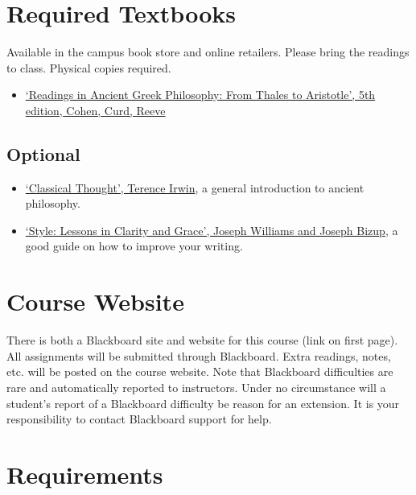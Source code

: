 \documentclass[article,oneside]{memoir}
\begin{document}
\section{Required Textbooks}

Available in the campus book store and online retailers. Please bring the readings to class. Physical copies required.
\begin{itemize}
\item \href{https://www.amazon.com/Readings-Ancient-Greek-Philosophy-Aristotle/dp/1624665322/ref=dp_ob_title_bk}{`Readings in Ancient Greek Philosophy: From Thales to Aristotle', 5th edition, Cohen, Curd, Reeve}


\end{itemize}
\subsection{Optional}

\begin{itemize}
\item \href{https://www.amazon.com/Classical-Thought-History-Western-Philosophy/dp/0192891774/ref=sr_1_1?s=books&ie=UTF8&qid=1515009994&sr=1-1&keywords=classical+thought}{`Classical Thought', Terence Irwin}, a general introduction to ancient philosophy.

\item \href{http://www.amazon.com/Style-Lessons-Clarity-Grace-11th/dp/0321898680/ref=sr_1_1?ie=UTF8&qid=1452356026&sr=8-1&keywords=lessons+in+clarity+and+grace}{`Style: Lessons in Clarity and Grace', Joseph Williams and Joseph Bizup}, a good guide on how to improve your writing. 
\end{itemize}
\section{Course Website}
There is both a Blackboard site and website for this course (link on first page). All assignments will be submitted through Blackboard. Extra readings, notes, etc. will be posted on the course website. Note that Blackboard difficulties are rare and automatically reported to instructors. Under no circumstance will a student's report of a Blackboard difficulty be reason for an extension. It is your responsibility to contact Blackboard support for help.


\section{Requirements}
\end{document}
